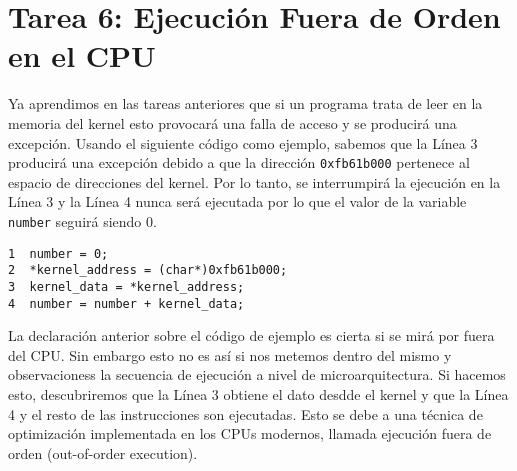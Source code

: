 

%
%
%
%







\section{Tarea 6: Ejecución Fuera de Orden en el CPU}

Ya aprendimos en las tareas anteriores que si un programa trata de leer en la memoria del kernel esto provocará una falla de acceso y se producirá una excepción. 
Usando el siguiente código como ejemplo, sabemos que la Línea 3 producirá una excepción debido a que la dirección \texttt{0xfb61b000} pertenece al espacio de direcciones del kernel. Por lo tanto, se interrumpirá la ejecución en la Línea 3 y la Línea 4 nunca será ejecutada por lo que el valor de la variable \texttt{number} seguirá siendo 0.

\begin{lstlisting}
1  number = 0;
2  *kernel_address = (char*)0xfb61b000;
3  kernel_data = *kernel_address;
4  number = number + kernel_data;
\end{lstlisting}

La declaración anterior sobre el código de ejemplo es cierta si se mirá por fuera del CPU.
Sin embargo esto no es así si nos metemos dentro del mismo y observacioness la secuencia de ejecución a nivel de microarquitectura. Si hacemos esto, descubriremos que la Línea 3 obtiene el dato desdde el kernel y que la Línea 4 y el resto de las instrucciones son ejecutadas. Esto se debe a una técnica de optimización implementada en los CPUs modernos, llamada ejecución fuera de orden (out-of-order execution).

